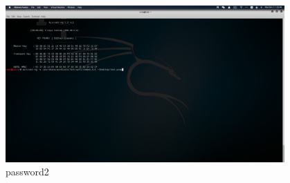 \documentclass[onecolumn,oneside]{SUSTechHomework}
\begin{document}
      \begin{figure}[H]
        \centering
        \includegraphics[width=0.95\textwidth]{img/pic5.png}
        \caption{password2}
      \end{figure}
\end{document}
